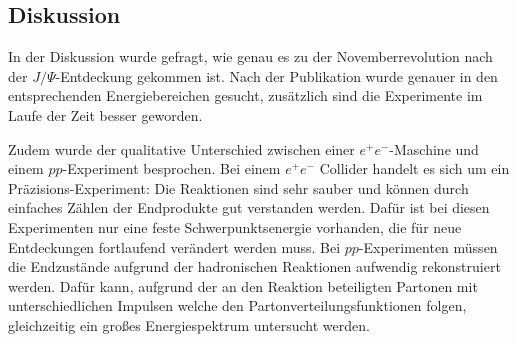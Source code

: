 \subsection{Diskussion}
In der Diskussion wurde gefragt, wie genau es zu der Novemberrevolution nach der $J/\Psi$-Entdeckung gekommen ist.
Nach der Publikation wurde genauer in den entsprechenden Energiebereichen gesucht, zusätzlich sind die Experimente im Laufe der Zeit besser geworden.

Zudem wurde der qualitative Unterschied zwischen einer $e^+ e^-$-Maschine und einem $pp$-Experiment besprochen.
Bei einem $e^+ e^-$ Collider handelt es sich um ein Präzisions-Experiment: Die Reaktionen sind sehr sauber und können durch einfaches Zählen der Endprodukte gut verstanden werden.
Dafür ist bei diesen Experimenten nur eine feste Schwerpunktsenergie vorhanden, die für neue Entdeckungen fortlaufend verändert werden muss.
Bei $pp$-Experimenten müssen die Endzustände aufgrund der hadronischen Reaktionen aufwendig rekonstruiert werden.
Dafür kann, aufgrund der an den Reaktion beteiligten Partonen mit unterschiedlichen Impulsen welche den Partonverteilungsfunktionen folgen, gleichzeitig ein großes Energiespektrum untersucht werden.
